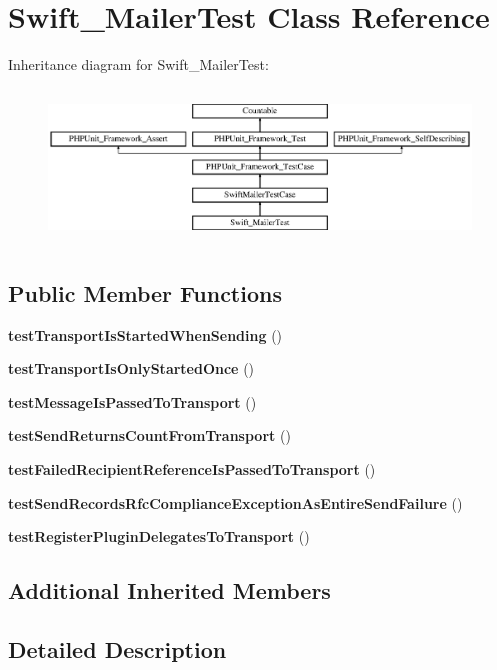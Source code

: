\section{Swift\+\_\+\+Mailer\+Test Class Reference}
\label{class_swift___mailer_test}
Inheritance diagram for Swift\+\_\+\+Mailer\+Test\+:\begin{figure}[H]
\begin{center}
\leavevmode
\includegraphics[height=4.129793cm]{class_swift___mailer_test}
\end{center}
\end{figure}
\subsection*{Public Member Functions}
\begin{DoxyCompactItemize}
\item 
{\bf test\+Transport\+Is\+Started\+When\+Sending} ()
\item 
{\bf test\+Transport\+Is\+Only\+Started\+Once} ()
\item 
{\bf test\+Message\+Is\+Passed\+To\+Transport} ()
\item 
{\bf test\+Send\+Returns\+Count\+From\+Transport} ()
\item 
{\bf test\+Failed\+Recipient\+Reference\+Is\+Passed\+To\+Transport} ()
\item 
{\bf test\+Send\+Records\+Rfc\+Compliance\+Exception\+As\+Entire\+Send\+Failure} ()
\item 
{\bf test\+Register\+Plugin\+Delegates\+To\+Transport} ()
\end{DoxyCompactItemize}
\subsection*{Additional Inherited Members}


\subsection{Detailed Description}


